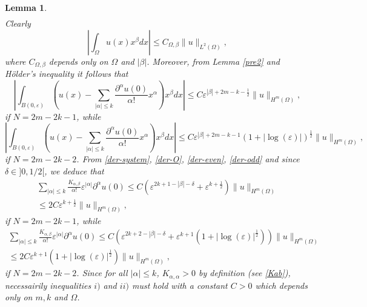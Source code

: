 \documentclass[11pt,a4paper]{amsart}
\numberwithin{equation}{section}
\newtheorem{lemma}[equation]{Lemma}
\begin{document}
\begin{lemma}
\begin{multline}
\end{multline}
Clearly
\begin{equation}\label{der-O}
\left|\int_{\Omega}u(x)x^{\beta}dx\right|\leq C_{\Omega,\beta}\|u\|_{L^2(\Omega)},
\end{equation}
where $C_{\Omega,\beta}$ depends only on $\Omega$ and $|\beta|$. Moreover, from Lemma \ref{pre2} and H\"older's inequality it follows that
\begin{equation}\label{der-even}
\left|\int_{B(0,\varepsilon)}\left(u(x)-\sum_{|\alpha|\leq k}\frac{\partial^{\alpha}u(0)}{\alpha !}x^{\alpha}\right)x^{\beta}dx\right|\leq C\varepsilon^{|\beta|+2m-k-\frac{1}{2}}\|u\|_{H^m(\Omega)},
\end{equation}
if $N=2m-2k-1$, while
\begin{equation}\label{der-odd}
\left|\int_{B(0,\varepsilon)}\left(u(x)-\sum_{|\alpha|\leq k}\frac{\partial^{\alpha}u(0)}{\alpha !}x^{\alpha}\right)x^{\beta}dx\right|\leq C\varepsilon^{|\beta|+2m-k-1}(1+|\log(\varepsilon)|)^{\frac{1}{2}}\|u\|_{H^m(\Omega)},
\end{equation}
if $N=2m-2k-2$.
From \eqref{der-system}, \eqref{der-O}, \eqref{der-even}, \eqref{der-odd} and since $\delta\in]0,1/2[$, we deduce that
\begin{multline*}%
\sum_{|\alpha|\leq k}\frac{K_{\alpha,\beta}}{\alpha !}\varepsilon^{|\alpha|}\partial^{\alpha}u(0)\leq C (\varepsilon^{2k+1-|\beta|-\delta}+\varepsilon^{k+\frac{1}{2}})\|u\|_{H^m(\Omega)}\\
\leq 2C \varepsilon^{k+\frac{1}{2}}\|u\|_{H^m(\Omega)},
\end{multline*}
if $N=2m-2k-1$, while
\begin{multline*}%
\sum_{|\alpha|\leq k}\frac{K_{\alpha,\beta}}{\alpha !}\varepsilon^{|\alpha|}\partial^{\alpha}u(0)\leq C (\varepsilon^{2k+2-|\beta|-\delta}+\varepsilon^{k+1}(1+|\log(\varepsilon)|^{\frac{1}{2}}))\|u\|_{H^m(\Omega)}\\
\leq 2C \varepsilon^{k+1}(1+|\log(\varepsilon)|^{\frac{1}{2}})\|u\|_{H^m(\Omega)},
\end{multline*}
if $N=2m-2k-2$. Since for all $|\alpha|\leq k$, $K_{\alpha,\alpha}>0$ by definition (see \eqref{Kab}), necessairily inequalities $i)$ and $ii)$ must hold with a constant $C>0$ which depends only on $m,k$ and $\Omega$.


\end{lemma}
\end{document}
